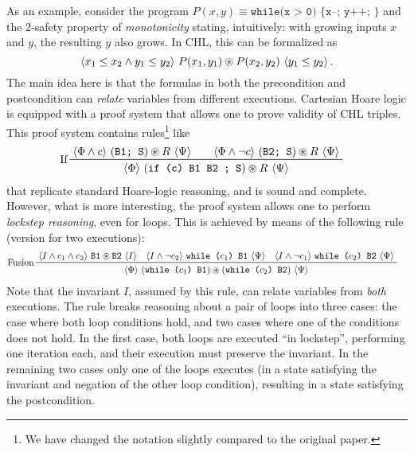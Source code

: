 As an example, consider the program $P(x,y) \equiv \texttt{while(x > 0) \{ x--; y++; \} }$ and the 2-safety property
of \emph{monotonicity} stating, intuitively: with growing inputs $x$ and $y$, the resulting $y$ also grows.
In CHL, this can be formalized as
\begin{equation}\label{eq:mono_formula}
\langle x_1 \leq x_2 \land y_1 \leq y_2  \rangle\ P(x_1, y_1)\circledast{}P(x_2, y_2)\  \langle y_1 \leq y_2 \rangle \, .
\end{equation}
The main idea here is that the formulas in both the precondition and
postcondition can \emph{relate} variables from different executions.
%
Cartesian Hoare logic is equipped with a proof system that allows one to prove validity of CHL triples.
This proof system contains rules\footnote{We have changed the notation
  slightly compared to the original paper.} like
\begin{align}\label{chlRule:If}
    & \prftree[l]{If}
      { %
        { \chl{\Phi \land c}{(\texttt{B1; S}) \st R}{\Psi} } \qquad
        { \chl{\Phi \land \neg c}{(\texttt{B2; S}) \st R}{\Psi} }
      }
      { \chl{\Phi}{(\texttt{if (c) {B1} {B2} ; S}) \st R}{\Psi} }
\end{align}
that replicate standard Hoare-logic reasoning, and is sound and complete. 
However, what is more interesting, the proof system allows one to perform \emph{lockstep reasoning},
even for loops. This is achieved by means of the following rule (version for two executions):
\begin{align*}
  & \prftree[l]{Fusion}
    {
    \chl{I \land c_1 \land c_2}{\texttt{B1} \st \texttt{B2}}{I} \quad
    \chl{I \land \neg c_2}{\texttt{while (}c_1\texttt{) {B1}}}{\Psi} \quad
    \chl{I \land \neg c_1}{\texttt{while (}c_2\texttt{) {B2}}}{\Psi}    
  }
  { \chl{\Phi}{(\texttt{while (}c_1\texttt{) {B1}}) \st (\texttt{while (}c_2\texttt{) {B2}})} {\Psi}}
\end{align*}
Note that the invariant $I$, assumed by this rule, can relate variables from \emph{both} executions.
%
The rule breaks reasoning about a pair of loops into three cases: the case
where both loop conditions hold, and two cases where one of the conditions
does not hold.  In the first case, both loops are executed ``in lockstep'',
performing one iteration each, and their execution must preserve the
invariant. In the remaining two cases only one of the loops executes (in a
state satisfying the invariant and negation of the other loop condition),
resulting in a state satisfying the postcondition.


